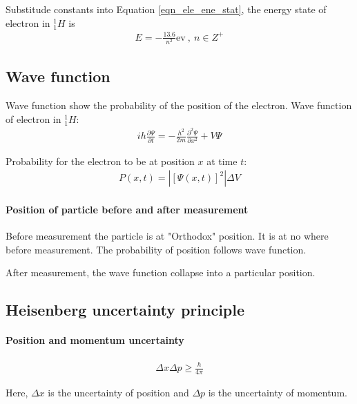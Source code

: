             Substitude constants into Equation \ref{eqn_ele_ene_stat}, the energy state of electron in $_1^1 H$ is
            \begin{align}
                E = - \frac{13.6}{n^2} \mathrm{ev} \ , \ n \in Z^+
            \end{align}

    \subsection{Wave function}
        Wave function show the probability of the position of the electron.
        Wave function of electron in $_1^1 H$:
        \begin{align}
            i h \frac{\partial \Psi}{\partial t} = -\frac{h^2}{2 m} \frac{\partial^2 \Psi}{\partial x^2} + V \Psi
        \end{align}

        Probability for the electron to be at position $x$ at time $t$:
        \begin{align}
            P(x, t) = | [\Psi(x, t)]^2| \Delta V 
        \end{align}

        \paragraph{Position of particle before and after measurement}
            Before measurement the particle is at "Orthodox" position. It is at no where before measurement. The probability of position follows wave function.

            After measurement, the wave function collapse into a particular position.
    
    \subsection{Heisenberg uncertainty principle}
        \paragraph{Position and momentum uncertainty}
            \begin{align}
                \Delta x \Delta p \ge \frac{h}{4 \pi}
            \end{align}
            
            Here, $\Delta x$ is the uncertainty of position and $\Delta p$ is the uncertainty of momentum.
        
